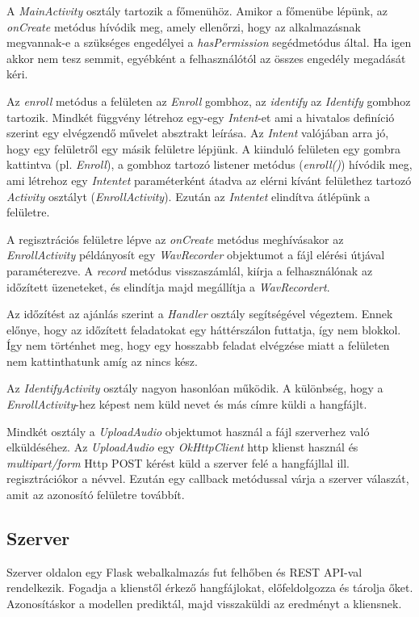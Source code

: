 A \emph{MainActivity} osztály tartozik a főmenühöz. Amikor a főmenübe lépünk, az \emph{onCreate} metódus hívódik meg, amely ellenőrzi, hogy az alkalmazásnak megvannak-e a szükséges engedélyei a \emph{hasPermission} segédmetódus által. Ha igen akkor nem tesz semmit, egyébként a felhasználótól az összes engedély megadását kéri.

Az \emph{enroll} metódus a felületen az \emph{Enroll} gombhoz, az \emph{identify} az \emph{Identify} gombhoz tartozik. Mindkét függvény létrehoz egy-egy \emph{Intent}-et ami a hivatalos definíció szerint egy elvégzendő művelet absztrakt leírása. Az \emph{Intent} valójában arra jó, hogy egy felületről egy másik felületre lépjünk. A kiinduló felületen egy gombra kattintva (pl. \emph{Enroll}), a gombhoz tartozó listener metódus (\emph{enroll()}) hívódik meg, ami létrehoz egy \emph{Intentet} paraméterként átadva az elérni kívánt felülethez tartozó \emph{Activity} osztályt (\emph{EnrollActivity}). Ezután az \emph{Intentet} elindítva átlépünk a felületre.

A regisztrációs felületre lépve az \emph{onCreate} metódus meghívásakor az \emph{EnrollActivity} példányosít egy \emph{WavRecorder} objektumot a fájl elérési útjával paraméterezve. A \emph{record} metódus visszaszámlál, kiírja a felhasználónak az időzített üzeneteket, és elindítja majd megállítja a \emph{WavRecordert}.

Az időzítést az ajánlás szerint a \emph{Handler} osztály segítségével végeztem. Ennek előnye, hogy az időzített feladatokat egy háttérszálon futtatja, így nem blokkol. Így nem történhet meg, hogy egy hosszabb feladat elvégzése miatt a felületen nem kattinthatunk amíg az nincs kész.

Az \emph{IdentifyActivity} osztály nagyon hasonlóan működik. A különbség, hogy a \emph{EnrollActivity}-hez képest nem küld nevet és más címre küldi a hangfájlt.

Mindkét osztály a \emph{UploadAudio} objektumot használ a fájl szerverhez való elküldéséhez. Az \emph{UploadAudio} egy \emph{OkHttpClient} http klienst használ és \emph{multipart/form} Http POST kérést küld a szerver felé a hangfájllal ill. regisztrációkor a névvel. Ezután egy callback metódussal várja a szerver válaszát, amit az azonosító felületre továbbít.

\subsection{Szerver}

Szerver oldalon egy Flask webalkalmazás fut felhőben és REST API-val rendelkezik. Fogadja a klienstől érkező hangfájlokat, előfeldolgozza és tárolja őket. Azonosításkor a modellen prediktál, majd visszaküldi az eredményt a kliensnek.

